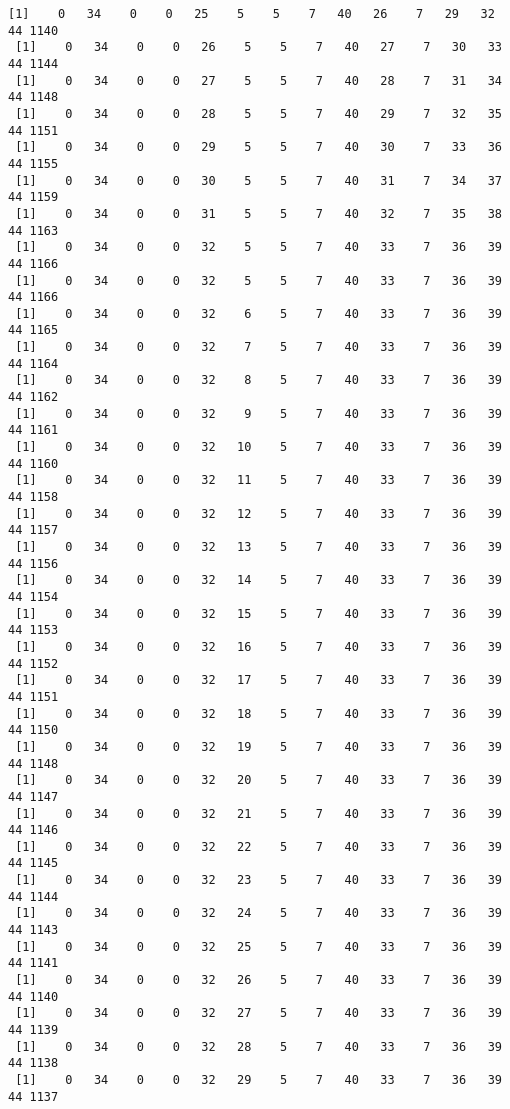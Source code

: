 \documentclass[11pt]{article}
\begin{document}
\begin{Verbatim}[commandchars=\\\{\}]
 [1]    0   34    0    0   25    5    5    7   40   26    7   29   32   44 1140
 [1]    0   34    0    0   26    5    5    7   40   27    7   30   33   44 1144
 [1]    0   34    0    0   27    5    5    7   40   28    7   31   34   44 1148
 [1]    0   34    0    0   28    5    5    7   40   29    7   32   35   44 1151
 [1]    0   34    0    0   29    5    5    7   40   30    7   33   36   44 1155
 [1]    0   34    0    0   30    5    5    7   40   31    7   34   37   44 1159
 [1]    0   34    0    0   31    5    5    7   40   32    7   35   38   44 1163
 [1]    0   34    0    0   32    5    5    7   40   33    7   36   39   44 1166
 [1]    0   34    0    0   32    5    5    7   40   33    7   36   39   44 1166
 [1]    0   34    0    0   32    6    5    7   40   33    7   36   39   44 1165
 [1]    0   34    0    0   32    7    5    7   40   33    7   36   39   44 1164
 [1]    0   34    0    0   32    8    5    7   40   33    7   36   39   44 1162
 [1]    0   34    0    0   32    9    5    7   40   33    7   36   39   44 1161
 [1]    0   34    0    0   32   10    5    7   40   33    7   36   39   44 1160
 [1]    0   34    0    0   32   11    5    7   40   33    7   36   39   44 1158
 [1]    0   34    0    0   32   12    5    7   40   33    7   36   39   44 1157
 [1]    0   34    0    0   32   13    5    7   40   33    7   36   39   44 1156
 [1]    0   34    0    0   32   14    5    7   40   33    7   36   39   44 1154
 [1]    0   34    0    0   32   15    5    7   40   33    7   36   39   44 1153
 [1]    0   34    0    0   32   16    5    7   40   33    7   36   39   44 1152
 [1]    0   34    0    0   32   17    5    7   40   33    7   36   39   44 1151
 [1]    0   34    0    0   32   18    5    7   40   33    7   36   39   44 1150
 [1]    0   34    0    0   32   19    5    7   40   33    7   36   39   44 1148
 [1]    0   34    0    0   32   20    5    7   40   33    7   36   39   44 1147
 [1]    0   34    0    0   32   21    5    7   40   33    7   36   39   44 1146
 [1]    0   34    0    0   32   22    5    7   40   33    7   36   39   44 1145
 [1]    0   34    0    0   32   23    5    7   40   33    7   36   39   44 1144
 [1]    0   34    0    0   32   24    5    7   40   33    7   36   39   44 1143
 [1]    0   34    0    0   32   25    5    7   40   33    7   36   39   44 1141
 [1]    0   34    0    0   32   26    5    7   40   33    7   36   39   44 1140
 [1]    0   34    0    0   32   27    5    7   40   33    7   36   39   44 1139
 [1]    0   34    0    0   32   28    5    7   40   33    7   36   39   44 1138
 [1]    0   34    0    0   32   29    5    7   40   33    7   36   39   44 1137

\end{Verbatim}
\end{document}
